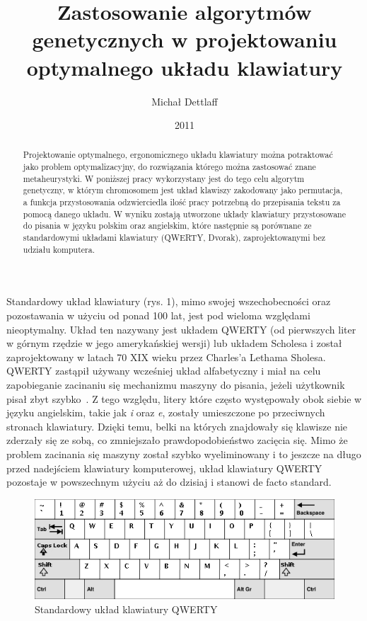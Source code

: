 \documentclass[brudnopis]{xmgr}
\author   {Michał Dettlaff}
\title    {Zastosowanie algorytmów genetycznych w projektowaniu optymalnego układu klawiatury}
\date     {2011}
\begin{document}
\begin{abstract}
  Projektowanie optymalnego, ergonomicznego układu klawiatury można potraktować jako problem optymalizacyjny, do rozwiązania którego można zastosować znane metaheurystyki. W poniższej pracy wykorzystany jest do tego celu algorytm genetyczny, w którym chromosomem jest układ klawiszy zakodowany jako permutacja, a funkcja przystosowania odzwierciedla ilość pracy potrzebną do przepisania tekstu za pomocą danego układu. W wyniku zostają utworzone układy klawiatury przystosowane do pisania w języku polskim oraz angielskim, które następnie są porównane ze standardowymi układami klawiatury (QWERTY, Dvorak), zaprojektowanymi bez udziału komputera.
\end{abstract}

\maketitle
%
\introduction

Standardowy układ klawiatury (rys. 1), mimo swojej wszechobecności oraz pozostawania w użyciu od ponad 100 lat, jest pod wieloma względami nieoptymalny. Układ ten nazywany jest układem QWERTY (od pierwszych liter w górnym rzędzie w jego amerykańskiej wersji) lub układem Scholesa i został zaprojektowany w latach 70 XIX wieku przez Charles'a Lethama Sholesa. QWERTY zastąpił używany wcześniej układ alfabetyczny i miał na celu zapobieganie zacinaniu się mechanizmu maszyny do pisania, jeżeli użytkownik pisał zbyt szybko~\cite{Norman:1988:DOET}. Z tego względu, litery które często występowały obok siebie w języku angielskim, takie jak \emph{i} oraz \emph{e}, zostały umieszczone po przeciwnych stronach klawiatury. Dzięki temu, belki na których znajdowały się klawisze nie zderzały się ze sobą, co zmniejszało prawdopodobieństwo zacięcia się. Mimo że problem zacinania się maszyny został szybko wyeliminowany i to jeszcze na długo przed nadejściem klawiatury komputerowej, układ klawiatury QWERTY pozostaje w powszechnym użyciu aż do dzisiaj i stanowi de facto standard.

\begin{figure}[!tbh]
\centering
\includegraphics[width=.8\hsize]{fig/qwerty}
\caption{Standardowy układ klawiatury QWERTY}
\end{figure}
\end{document}
